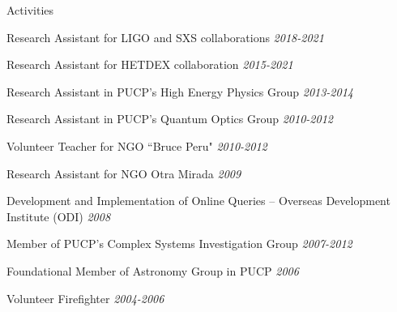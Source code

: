 \documentclass{resume}
\begin{document}
\newpage
\begin{rSection}{Activities} \itemsep -3pt
\item Research Assistant for LIGO and SXS collaborations \hfill{\em 2018-2021}
\item Research Assistant for HETDEX collaboration \hfill{\em 2015-2021}
\item Research Assistant in PUCP's High Energy Physics Group \hfill{\em 2013-2014}
\item Research Assistant in PUCP's Quantum Optics Group \hfill{\em 2010-2012}
\item Volunteer Teacher for NGO ``Bruce Peru" \hfill{\em 2010-2012}
\item Research Assistant for NGO Otra Mirada \hfill{\em 2009}
\item Development and Implementation of Online Queries -- Overseas Development Institute (ODI) \hfill{\em 2008}
\item Member of PUCP's Complex Systems Investigation Group \hfill{\em 2007-2012}
\item Foundational Member of Astronomy Group in PUCP \hfill{\em 2006}
\item Volunteer Firefighter \hfill{\em 2004-2006}

\end{rSection}
\end{document}
